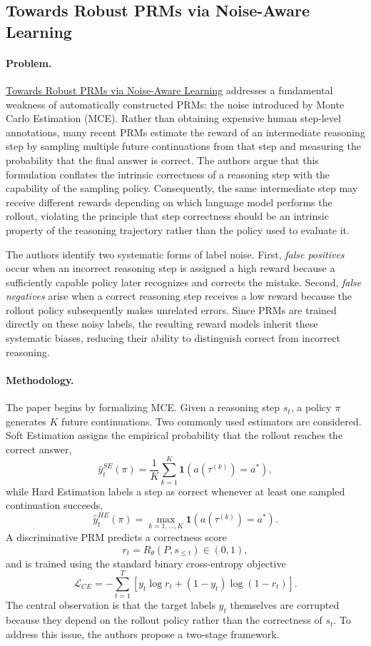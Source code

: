 \documentclass[11pt]{article}
\begin{document}
\subsection{Towards Robust PRMs via Noise-Aware Learning}

\paragraph{Problem.}
\href{https://arxiv.org/abs/2601.12748}{Towards Robust PRMs via Noise-Aware Learning} addresses a fundamental weakness of automatically constructed PRMs: the noise introduced by Monte Carlo Estimation (MCE). Rather than obtaining expensive human step-level annotations, many recent PRMs estimate the reward of an intermediate reasoning step by sampling multiple future continuations from that step and measuring the probability that the final answer is correct. The authors argue that this formulation conflates the intrinsic correctness of a reasoning step with the capability of the sampling policy. Consequently, the same intermediate step may receive different rewards depending on which language model performs the rollout, violating the principle that step correctness should be an intrinsic property of the reasoning trajectory rather than the policy used to evaluate it.

The authors identify two systematic forms of label noise. First, \emph{false positives} occur when an incorrect reasoning step is assigned a high reward because a sufficiently capable policy later recognizes and corrects the mistake. Second, \emph{false negatives} arise when a correct reasoning step receives a low reward because the rollout policy subsequently makes unrelated errors. Since PRMs are trained directly on these noisy labels, the resulting reward models inherit these systematic biases, reducing their ability to distinguish correct from incorrect reasoning.

\paragraph{Methodology.}
The paper begins by formalizing MCE. Given a reasoning step \(s_t\), a policy \(\pi\) generates \(K\) future continuations. Two commonly used estimators are considered. Soft Estimation assigns the empirical probability that the rollout reaches the correct answer,
\[
\hat y_t^{SE}(\pi)
=
\frac{1}{K}
\sum_{k=1}^{K}
\mathbf{1}
\left(
a(\tau^{(k)})=a^*
\right),
\]
while Hard Estimation labels a step as correct whenever at least one sampled continuation succeeds,
\[
\hat y_t^{HE}(\pi)
=
\max_{k=1,\ldots,K}
\mathbf{1}
\left(
a(\tau^{(k)})=a^*
\right).
\]
A discriminative PRM predicts a correctness score
\[
r_t
=
R_\theta(P,s_{\le t})
\in(0,1),
\]
and is trained using the standard binary cross-entropy objective
\[
\mathcal{L}_{CE}
=
-
\sum_{t=1}^{T}
\left[
y_t\log r_t
+
(1-y_t)\log(1-r_t)
\right].
\]
The central observation is that the target labels \(y_t\) themselves are corrupted because they depend on the rollout policy rather than the correctness of \(s_t\).
To address this issue, the authors propose a two-stage framework.
\end{document}
